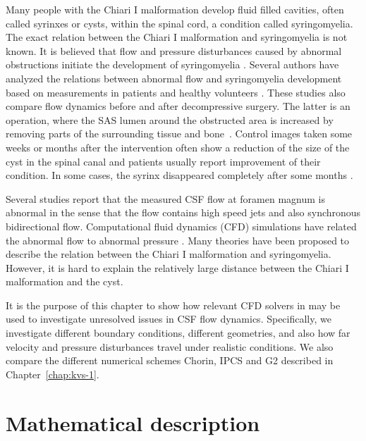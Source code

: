 Many people with the Chiari I malformation develop fluid filled
cavities, often called syrinxes or cysts, within the spinal cord,
 a condition called syringomyelia. The exact
relation between the Chiari I malformation and syringomyelia is not
known. It is believed that flow and pressure disturbances caused
by abnormal obstructions initiate the development of syringomyelia
\citep{OldfieldMuraszkoShawkerEtAl1994}. Several authors have
analyzed the relations between abnormal flow and syringomyelia
development based on measurements in patients and healthy volunteers
\citep{HeissPatronasDeVroomEtAl1999,PinnaAlessandriniAlfieriEtAl2000,HofmannWarmuth-MetzBendszusEtAl2000,HaughtonKorosecMedowEtAl2003}.
These studies also compare flow dynamics before and after decompressive
surgery. The latter is an operation, where the SAS lumen around the
obstructed area is increased by removing parts of the surrounding
tissue and bone~\citep{MilhoratBolognese2003}. Control images
taken some weeks or months after the intervention often show
a reduction of the size of the cyst in the spinal canal and
patients usually report improvement of their condition. In
some cases, the syrinx disappeared completely after some months
\citep{OldfieldMuraszkoShawkerEtAl1994,PinnaAlessandriniAlfieriEtAl2000,HeissPatronasDeVroomEtAl1999}.

Several studies \citep{Quigley2004,HaughtonKorosecMedowEtAl2003}
report that the measured CSF flow at foramen magnum is abnormal
in the sense that the flow contains high speed jets and also
synchronous bidirectional flow.  Computational fluid dynamics
(CFD) simulations have related the abnormal flow to abnormal pressure
\citep{RoldanHaughtonWiebenEtAl2009,HentschelMardalLovgren2010,LingeHaughtonLovgren2010,LingeHaughtonLovgren2011}.
Many theories have been proposed to describe the relation between the
Chiari I malformation and syringomyelia. However, it is hard to explain
the relatively large distance between the Chiari I malformation and
the cyst.

It is the purpose of this chapter to show how relevant CFD solvers in
\fenics may be used to investigate unresolved issues in CSF flow dynamics.
Specifically, we investigate different boundary conditions, different
geometries, and also how far velocity and pressure disturbances travel
under realistic conditions. We also compare the different numerical
schemes Chorin, IPCS and G2 described in Chapter~\ref{chap:kvs-1}.

\section{Mathematical description}

